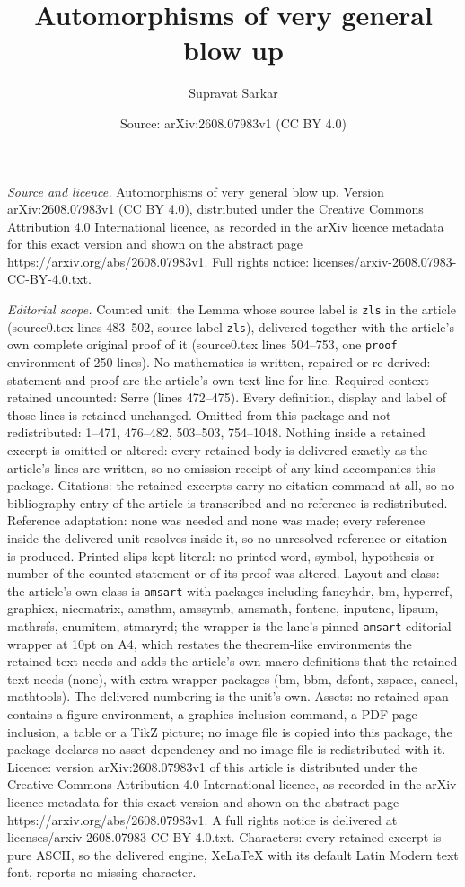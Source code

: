 \documentclass[10pt,a4paper]{amsart}
\title[Automorphisms of very general blow up]{Automorphisms of very general blow up}
\author{Supravat Sarkar}
\date{Source: arXiv:2608.07983v1 (CC BY 4.0)}
\begin{document}
\maketitle

\noindent\emph{Source and licence.} Automorphisms of very general blow up. Version arXiv:2608.07983v1 (CC BY 4.0), distributed under the Creative Commons Attribution 4.0 International licence, as recorded in the arXiv licence metadata for this exact version and shown on the abstract page https://arxiv.org/abs/2608.07983v1. Full rights notice: licenses/arxiv-2608.07983-CC-BY-4.0.txt.\par\smallskip

\noindent\textit{Editorial scope.} Counted unit: the Lemma whose source label is \texttt{zls} in the article (source0.tex lines 483--502, source label \texttt{zls}), delivered together with the article's own complete original proof of it (source0.tex lines 504--753, one \texttt{proof} environment of 250 lines). No mathematics is written, repaired or re-derived: statement and proof are the article's own text line for line. Required context retained uncounted: Serre (lines 472--475). Every definition, display and label of those lines is retained unchanged. Omitted from this package and not redistributed: 1--471, 476--482, 503--503, 754--1048. Nothing inside a retained excerpt is omitted or altered: every retained body is delivered exactly as the article's lines are written, so no omission receipt of any kind accompanies this package. Citations: the retained excerpts carry no citation command at all, so no bibliography entry of the article is transcribed and no reference is redistributed. Reference adaptation: none was needed and none was made; every reference inside the delivered unit resolves inside it, so no unresolved reference or citation is produced. Printed slips kept literal: no printed word, symbol, hypothesis or number of the counted statement or of its proof was altered. Layout and class: the article's own class is \texttt{amsart} with packages including fancyhdr, bm, hyperref, graphicx, nicematrix, amsthm, amssymb, amsmath, fontenc, inputenc, lipsum, mathrsfs, enumitem, stmaryrd; the wrapper is the lane's pinned \texttt{amsart} editorial wrapper at 10pt on A4, which restates the theorem-like environments the retained text needs and adds the article's own macro definitions that the retained text needs (none), with extra wrapper packages (bm, bbm, dsfont, xspace, cancel, mathtools). The delivered numbering is the unit's own. Assets: no retained span contains a figure environment, a graphics-inclusion command, a PDF-page inclusion, a table or a TikZ picture; no image file is copied into this package, the package declares no asset dependency and no image file is redistributed with it. Licence: version arXiv:2608.07983v1 of this article is distributed under the Creative Commons Attribution 4.0 International licence, as recorded in the arXiv licence metadata for this exact version and shown on the abstract page https://arxiv.org/abs/2608.07983v1. A full rights notice is delivered at licenses/arxiv-2608.07983-CC-BY-4.0.txt. Characters: every retained excerpt is pure ASCII, so the delivered engine, XeLaTeX with its default Latin Modern text font, reports no missing character.
\end{document}
